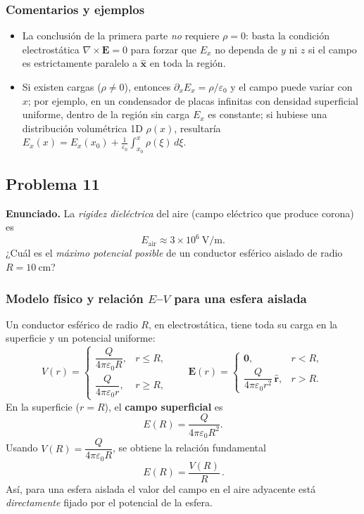 \documentclass{article}
\begin{document}
\subsubsection*{Comentarios y ejemplos}
\begin{itemize}
\item La conclusión de la primera parte \emph{no} requiere $\rho=0$: basta la condición electrostática $\nabla\times\mathbf E=0$ para forzar que $E_x$ no dependa de $y$ ni $z$ si el campo es estrictamente paralelo a $\hat{\mathbf x}$ en toda la región.
\item Si existen cargas ($\rho\neq 0$), entonces $\partial_x E_x=\rho/\varepsilon_0$ y el campo puede variar con $x$; por ejemplo, en un condensador de placas infinitas con densidad superficial uniforme, dentro de la región sin carga $E_x$ es constante; si hubiese una distribución volumétrica 1D $\rho(x)$, resultaría $E_x(x)=E_x(x_0)+\frac{1}{\varepsilon_0}\int_{x_0}^x \rho(\xi)\,d\xi$.
\end{itemize}


\subsection{Problema 11} \vspace{0.5cm}

\textbf{Enunciado.} La \emph{rigidez dieléctrica} del aire (campo eléctrico que produce corona) es 
\[
E_{\text{air}} \approx 3\times 10^{6}\ \text{V/m}.
\]
¿Cuál es el \emph{máximo potencial posible} de un conductor esférico aislado de radio $R=10\ \text{cm}$?

\subsubsection*{Modelo físico y relación $E$–$V$ para una esfera aislada}
Un conductor esférico de radio $R$, en electrostática, tiene toda su carga en la superficie y un potencial uniforme:
\[
V(r)=
\begin{cases}
\dfrac{Q}{4\pi\varepsilon_0 R}, & r\le R,\\[6pt]
\dfrac{Q}{4\pi\varepsilon_0 r}, & r\ge R,
\end{cases}
\qquad
\mathbf E(r)=
\begin{cases}
\mathbf 0, & r<R,\\[4pt]
\dfrac{Q}{4\pi\varepsilon_0 r^2}\,\hat{\mathbf r}, & r>R.
\end{cases}
\]
En la superficie ($r=R$), el \textbf{campo superficial} es
\[
E(R)=\frac{Q}{4\pi\varepsilon_0 R^2}.
\]
Usando $V(R)=\dfrac{Q}{4\pi\varepsilon_0 R}$, se obtiene la relación fundamental
\[
\boxed{\,E(R)=\frac{V(R)}{R}\,}.
\]
Así, para una esfera aislada el valor del campo en el aire adyacente está \emph{directamente} fijado por el potencial de la esfera.
\end{document}
